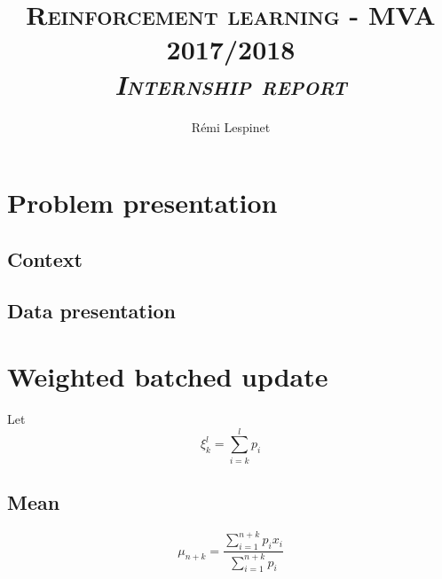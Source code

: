 \documentclass[a4paper, 11pt]{article}
\title{\textsc{Reinforcement learning - MVA 2017/2018 \\ \emph{Internship report}} }
\author{Rémi Lespinet}
\date{}
\begin{document}
\maketitle
\thispagestyle{fancy}



\section{Problem presentation}

\subsection{Context}

\subsection{Data presentation}





\section{Weighted batched update}

Let
\begin{displaymath}
  \xi_k^l = \sum_{i = k}^{l} p_i
\end{displaymath}

\subsection{Mean}

\begin{displaymath}
  \mu_{n + k} = \dfrac{\sum_{i = 1}^{n+k} p_i x_i}{\sum_{i = 1}^{n+k} p_i}
\end{displaymath}


\end{document}
